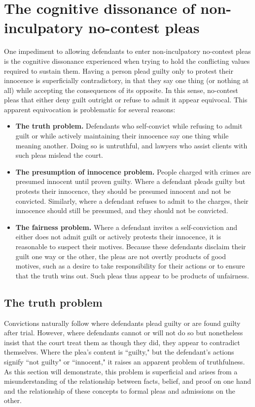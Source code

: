 \section{The cognitive dissonance of non-inculpatory no-contest pleas}

One impediment to allowing defendants to enter non-inculpatory no-contest pleas is the cognitive dissonance experienced when trying to hold the conflicting values required to sustain them. Having a person plead guilty only to protest their innocence is superficially contradictory, in that they say one thing (or nothing at all) while accepting the consequences of its opposite. In this sense, no-contest pleas that either deny guilt outright or refuse to admit it appear equivocal. This apparent equivocation is problematic for several reasons:

\begin{itemize}
    \item \textbf{The truth problem.} Defendants who self-convict while refusing to admit guilt or while actively maintaining their innocence say one thing while meaning another. Doing so is untruthful, and lawyers who assist clients with such pleas mislead the court. 
    \item \textbf{The presumption of innocence problem.} People charged with crimes are presumed innocent until proven guilty. Where a defendant pleads guilty but protests their innocence, they should be presumed innocent and not be convicted. Similarly, where a defendant refuses to admit to the charges, their innocence should still be presumed, and they should not be convicted.
    \item \textbf{The fairness problem.} Where a defendant invites a self-conviction and either does not admit guilt or actively protests their innocence, it is reasonable to suspect their motives. Because these defendants disclaim their guilt one way or the other, the pleas are not overtly products of good motives, such as a desire to take responsibility for their actions or to ensure that the truth wins out. Such pleas thus appear to be products of unfairness. 
\end{itemize}

\subsection{The truth problem}

Convictions naturally follow where defendants plead guilty or are found guilty after trial. However, where defendants cannot or will not do so but nonetheless insist that the court treat them as though they did, they appear to contradict themselves. Where the plea's content is ``guilty," but the defendant's actions signify ``not guilty" or ``innocent," it raises an apparent problem of truthfulness. As this section will demonstrate, this problem is superficial and arises from a misunderstanding of the relationship between facts, belief, and proof on one hand and the relationship of these concepts to formal pleas and admissions on the other.

